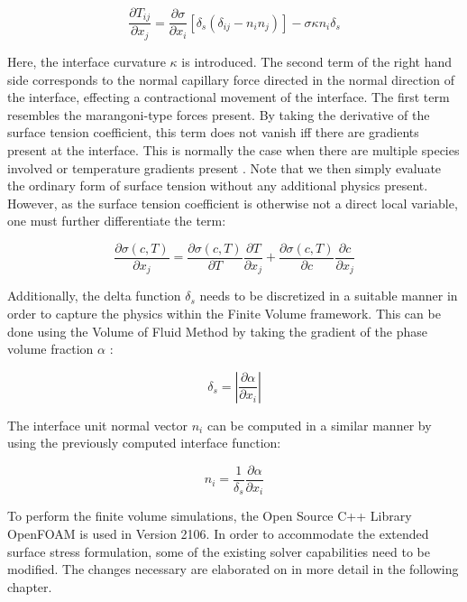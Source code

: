\documentclass[conference,final]{IEEEtran}
\begin{document}
\begin{equation}
    \frac{\partial T_{ij}}{\partial x_j} = \frac{\partial \sigma}{\partial x_i} [\delta_s(\delta_{ij} - n_i n_j)] - \sigma \kappa n_i \delta_s
\end{equation}

Here, the interface curvature $\kappa$ is introduced. The second term of the right hand side corresponds to the normal capillary force directed in the normal direction of the interface, effecting a contractional movement of the interface. The first term resembles the marangoni-type forces present. By taking the derivative of the surface tension coefficient, this term does not vanish iff there are gradients present at the interface. This is normally the case when there are multiple species involved or temperature gradients present \cite{j.straubThermokapillareGrenzflachenkonvektionGasblasen1990}. Note that we then simply evaluate the ordinary form of surface tension without any additional physics present. However, as the surface tension coefficient is otherwise not a direct local variable, one must further differentiate the term:

\begin{equation}
    \frac{\partial \sigma(c,T)}{\partial x_j} = \frac{\partial \sigma(c,T)}{\partial T} \frac{\partial T}{\partial x_j} + \frac{\partial \sigma(c,T)}{\partial c} \frac{\partial c}{\partial x_j}
    \label{eq:sigmadiff}
\end{equation}

Additionally, the delta function $\delta_s$ needs to be discretized in a suitable manner in order to capture the physics within the Finite Volume framework. This can be done using the Volume of Fluid Method by taking the gradient of the phase volume fraction $\alpha$ \cite{gueyffierVolumeofFluidInterfaceTracking1999,hirtVolumeFluidVOF1981}:

\begin{equation}
    \delta_s = \left\lvert \frac{\partial \alpha}{\partial x_i} \right\rvert
\end{equation}

The interface unit normal vector $n_i$ can be computed in a similar manner by using the previously computed interface function:

\begin{equation}
    n_i = \frac{1}{\delta_s} \frac{\partial \alpha}{\partial x_i}
\end{equation}

To perform the finite volume simulations, the Open Source C++ Library OpenFOAM is used in Version 2106. In order to accommodate the extended surface stress formulation, some of the existing solver capabilities need to be modified. The changes necessary are elaborated on in more detail in the following chapter.
\end{document}
